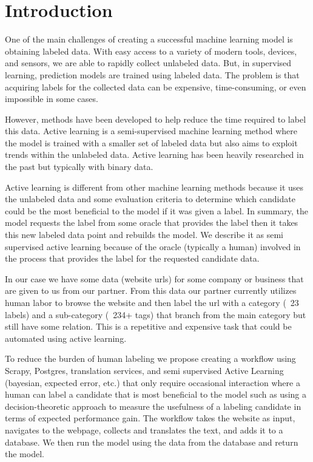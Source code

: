 \chapter*{Introduction}

One of the main challenges of creating a successful machine learning model is obtaining labeled data. With easy access to a variety of modern tools, devices, and sensors, we are able to rapidly collect unlabeled data. But, in supervised learning, prediction models are trained using labeled data. The problem is that acquiring labels for the collected data can be expensive, time-consuming, or even impossible in some cases.  

However, methods have been developed to help reduce the time required to label this data. Active learning is a semi-supervised machine learning method where the model is trained with a smaller set of labeled data but also aims to exploit trends within the unlabeled data. Active learning has been heavily researched in the past but typically with binary data.

Active learning is different from other machine learning methods because it uses the unlabeled data and some evaluation criteria to determine which candidate could be the most beneficial to the model if it was given a label. In summary, the model requests the label from some oracle that provides the label then it takes this new labeled data point and rebuilds the model. We describe it as semi supervised active learning because of the oracle (typically a human) involved in the process that provides the label for the requested candidate data. 

In our case we have some data (website urls) for some company or business that are given to us from our partner. From this data our partner currently utilizes human labor to browse the website and then label the url with a category (~23 labels) and a sub-category (~234+ tags) that branch from the main category but still have some relation. This is a repetitive and expensive task that could be automated using active learning.

To reduce the burden of human labeling we propose creating a workflow using Scrapy, Postgres, translation services, and semi supervised Active Learning (bayesian, expected error, etc.) that only require occasional interaction where a human can label a candidate that is most beneficial to the model such as using a decision-theoretic approach to measure the usefulness of a labeling candidate in terms of expected performance gain. The workflow takes the website as input, navigates to the webpage, collects and translates the text, and adds it to a database. We then run the model using the data from the database and return the model. 

